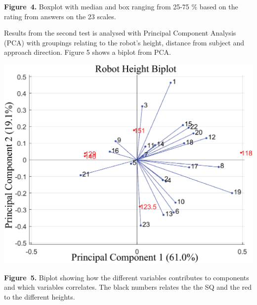 \documentclass[paperwidth=118cm,paperheight=84cm,landscape,fontscale=0.2941]{baposter}
\begin{document}
\begin{poster}
{\begin{center}
\textbf{Figure~4. }Boxplot with median and box ranging from 25-75 \% based on the rating from answers on the 23 scales.
\end{center}
\vspace{-10pt}
Results from the second test is analysed with Principal Component Analysis (PCA) with groupings relating to the robot's height, distance from subject and approach direction. Figure 5 shows a biplot from PCA.
\vspace{-10pt}
\begin{center}
	\includegraphics[width=0.9\linewidth]{RHeight-Biplot.eps}
	\vspace{-10pt}
\end{center}
\textbf{Figure~5. }Biplot showing how the different variables contributes to components and which variables correlates. The black numbers relates the the SQ and the red to the different heights.
\vspace{-5pt}


}
\end{poster}
\end{document}
